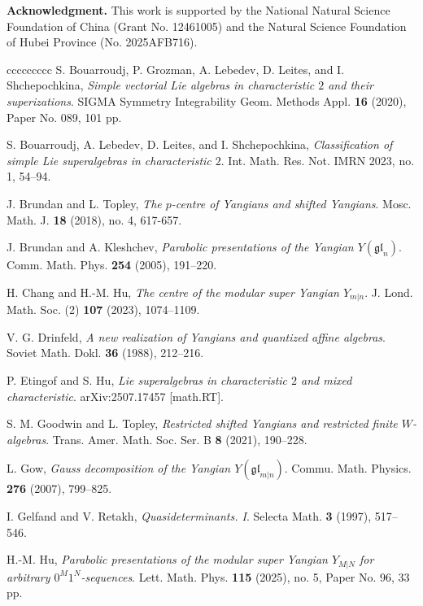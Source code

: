 \documentclass[12pt,reqno]{amsart}
\newcommand{\fgl}{\mathfrak{gl}}
\numberwithin{equation}{section}
\theoremstyle{Theorem}
\theoremstyle{remark}
\numberwithin{equation}{section}
\begin{document}
\bigskip
\noindent
\textbf{Acknowledgment.}
This work is supported by the National Natural
Science Foundation of China (Grant No. 12461005) and
the Natural Science Foundation of Hubei Province (No. 2025AFB716).
\begin{thebibliography}{ccccccccc}
 S. Bouarroudj, P. Grozman, A. Lebedev, D. Leites, and I. Shchepochkina,
{\em Simple vectorial Lie algebras in characteristic $2$ and their superizations}.
SIGMA Symmetry Integrability Geom. Methods Appl. \textbf{16} (2020), Paper No. 089, 101 pp.

 S. Bouarroudj, A. Lebedev, D. Leites, and I. Shchepochkina,
{\em Classification of simple Lie superalgebras in characteristic $2$}.
Int. Math. Res. Not. IMRN 2023, no. 1, 54--94.

 J. Brundan and L. Topley,
{\em The $p$-centre of Yangians and shifted Yangians}.
Mosc. Math. J. \textbf{18} (2018), no. 4, 617-657.

 J. Brundan and A. Kleshchev,
{\em Parabolic presentations of the Yangian $Y(\mathfrak{gl}_n)$}.
Comm. Math. Phys. \textbf{254} (2005), 191--220.

 H. Chang and H.-M. Hu,
{\em The centre of the modular super Yangian $Y_{m|n}$}.
J. Lond. Math. Soc. (2) \textbf{107} (2023), 1074--1109.


 V. G. Drinfeld,
{\em A new realization of Yangians and quantized affine algebras}.
Soviet Math. Dokl. \textbf{36} (1988), 212--216.

 P. Etingof and S. Hu,
{\em Lie superalgebras in characteristic $2$ and mixed characteristic}.
arXiv:2507.17457 [math.RT].

 S. M. Goodwin and L. Topley,
{\em Restricted shifted Yangians and restricted finite $W$-algebras}.
Trans. Amer. Math. Soc. Ser. B \textbf{8} (2021), 190--228. 

 L. Gow,
{\em Gauss decomposition of the Yangian $Y(\fgl_{m|n})$}.
Commu. Math. Physics. \textbf{276} (2007), 799--825.

 I. Gelfand and V. Retakh,
{\em Quasideterminants. I}.
Selecta Math. \textbf{3} (1997), 517--546.

 H.-M. Hu, {\em Parabolic presentations of the modular super Yangian $Y_{M|N}$ for arbitrary $0^M1^N$-sequences}.
Lett. Math. Phys. \textbf{115} (2025), no. 5, Paper No. 96, 33 pp.
 

\end{thebibliography}
\end{document}
